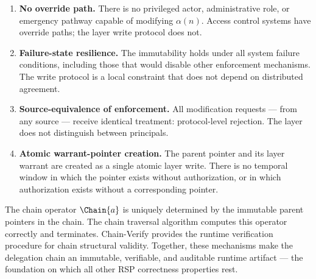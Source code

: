 \begin{enumerate}
    \item[(1)] \textbf{No override path.} There is no privileged actor, administrative role, or emergency pathway capable of modifying $\alpha(n)$. Access control systems have override paths; the \fact{} layer write protocol does not.
    \item[(2)] \textbf{Failure-state resilience.} The immutability holds under all system failure conditions, including those that would disable other enforcement mechanisms. The write protocol is a local constraint that does not depend on distributed agreement.
    \item[(3)] \textbf{Source-equivalence of enforcement.} All modification requests --- from any source --- receive identical treatment: protocol-level rejection. The \fact{} layer does not distinguish between principals.
    \item[(4)] \textbf{Atomic warrant-pointer creation.} The parent pointer and its \purpose{} layer warrant are created as a single atomic \fact{} layer write. There is no temporal window in which the pointer exists without authorization, or in which authorization exists without a corresponding pointer.
\end{enumerate}

The chain operator $\Chain{a}$ is uniquely determined by the immutable parent pointers in the chain. The chain traversal algorithm computes this operator correctly and terminates. Chain-Verify provides the runtime verification procedure for chain structural validity. Together, these mechanisms make the delegation chain an immutable, verifiable, and auditable runtime artifact --- the foundation on which all other RSP correctness properties rest.
